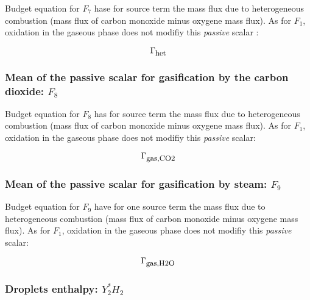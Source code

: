 Budget equation for $F_{7}$ hase for source term the mass flux due to
heterogeneous combustion (mass flux of carbon monoxide minus oxygene mass
flux). As for $F_{1}$, oxidation in the gaseous phase does not modifiy this {\em
  passive} scalar :

\begin{equation}
   \Gamma_{\mbox{\small het}}
\end{equation}   
         
 \subsubsection{Mean of the passive scalar for gasification by the carbon dioxide: $F_{8}$}  
 
 Budget equation for $F_{8}$ has for source term the mass flux due to
 heterogeneous combustion (mass flux of carbon monoxide minus oxygene mass
 flux). As for $F_{1}$, oxidation in the gaseous phase does not modifiy this
 {\em passive} scalar:
  
\begin{equation}
   \Gamma_{\mbox{\small gas,CO2}}
\end{equation}                         

 \subsubsection{Mean of the passive scalar for gasification by steam: $F_{9}$}  
 
 Budget equation for $F_{9}$ have for one source term the mass flux due to
 heterogeneous combustion (mass flux of carbon monoxide minus oxygene mass
 flux). As for $F_{1}$, oxidation in the gaseous phase does not modifiy this
 {\em passive} scalar:
 
\begin{equation}
   \Gamma_{\mbox{\small gas,H2O}}
\end{equation}                         

 



\subsubsection{Droplets enthalpy: $Y_{2}^{*}H_{2}$ }
 
